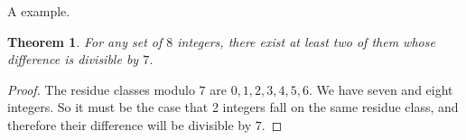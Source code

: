 \documentclass[12pt]{article}
\newtheorem*{thm}{Theorem}
\begin{document}
A  example.
\begin{thm} For any set of $8$ integers, there exist at least two of them 
whose difference is divisible by $7$.
\end{thm}

\small
\begin{proof}
The residue classes modulo $7$ are $0,1,2,3,4,5,6$. 
We have seven  and eight integers. So it must be the case that 2 integers fall on the same
residue class, and therefore their difference will be divisible by $7$.
\end{proof}
\end{document}
